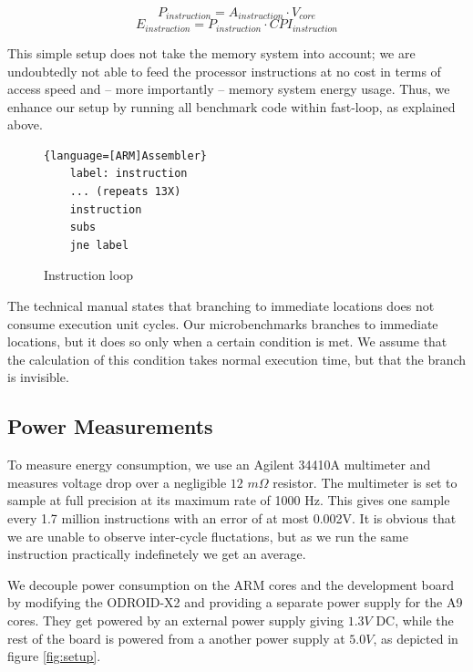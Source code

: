 \begin{equation}
    P_{instruction} = A_{instruction} \cdot V_{core}
\end{equation}
\begin{equation}
    E_{instruction} = P_{instruction} \cdot CPI_{instruction}
\end{equation}


This simple setup does not take the memory system into account; we are
undoubtedly not able to feed the processor instructions at no cost in terms of
access speed and -- more importantly -- memory system energy usage. Thus, we
enhance our setup by running all benchmark code within fast-loop, as explained
above.


\begin{figure}
    \begin{lstlisting}{language=[ARM]Assembler}
    label: instruction
    ... (repeats 13X)
    instruction
    subs
    jne label
    \end{lstlisting}
    \caption{Instruction loop}
    \label{list:inst_loop}
\end{figure}

The technical manual states that branching to immediate locations does not
consume execution unit cycles. Our microbenchmarks branches to immediate
locations, but it does so only when a certain condition is met. We assume that
the calculation of this condition takes normal execution time, but that the
branch is invisible.


\subsection{Power Measurements}
To measure energy consumption, we use an Agilent 34410A
multimeter\cite{agilent34410a} and measures voltage drop over a negligible $12$
$m\Omega$ resistor. The multimeter is set to sample at full precision at its
maximum rate of 1000 Hz. This gives one sample every 1.7 million instructions
with an error of at most 0.002V. It is obvious that we are unable to observe
inter-cycle fluctations, but as we run the same instruction practically
indefinetely we get an average.

We decouple power consumption on the ARM cores and the development board by
modifying the ODROID-X2 and providing a separate power supply for the A9 cores.
They get powered by an external power supply giving $1.3V$ DC, while the rest of
the board is powered from a another power supply at $5.0V$, as depicted in
figure \ref{fig:setup}.

